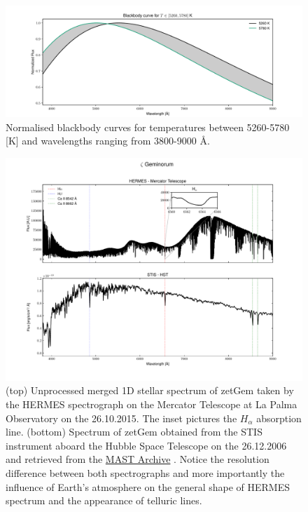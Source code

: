     \begin{figure}[H]
        \centering
        \includegraphics[width=\textwidth]{report/images/chap2_foundations/blackbody_zetgem.pdf}
        \caption{Normalised blackbody curves for temperatures between 5260-5780 [K] and wavelengths ranging from 3800-9000 \AA. }
        \label{2.1a}
    \end{figure}
    \begin{figure}[H]
        \centering
        \includegraphics[width=\textwidth]{report/images/chap2_foundations/zetgem_hermes_hst.pdf}
        \caption{(top) Unprocessed merged 1D stellar spectrum of \ac{zetGem} taken by the HERMES spectrograph on the Mercator Telescope at La Palma Observatory on the 26.10.2015. The inset pictures the $H_{\alpha}$ absorption line. (bottom) Spectrum of \ac{zetGem} obtained from the \ac{STIS} instrument aboard the Hubble Space Telescope on the 26.12.2006 and retrieved from the \href{https://mast.stsci.edu/portal/Mashup/Clients/Mast/Portal.html}{MAST Archive} . Notice the resolution difference between both spectrographs and more importantly the influence of Earth's atmosphere on the general shape of HERMES spectrum and the appearance of telluric lines.}
        \label{2.1b}
    \end{figure}
    
